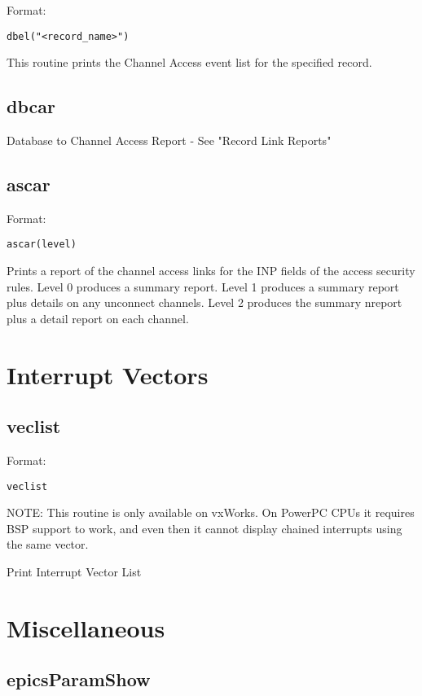 Format:

\begin{verbatim}dbel("<record_name>")
\end{verbatim}This routine prints the Channel Access event list for the specified record.

\subsection{dbcar}

Database to Channel Access Report - See "Record Link Reports"

\subsection{ascar}

Format:

\begin{verbatim}ascar(level)
\end{verbatim}Prints a report of the channel access links for the INP fields of the access security rules. Level 0 produces a summary 
report. Level 1 produces a summary report plus details on any unconnect channels. Level 2 produces the summary nreport 
plus a detail report on each channel.

\section{Interrupt Vectors}

\subsection{veclist}

Format:

\begin{verbatim}veclist
\end{verbatim}NOTE: This routine is only available on vxWorks. On PowerPC CPUs it requires BSP support to work, and even then it 
cannot display chained interrupts using the same vector.

Print Interrupt Vector List

\section{Miscellaneous}

\subsection{epicsParamShow}

